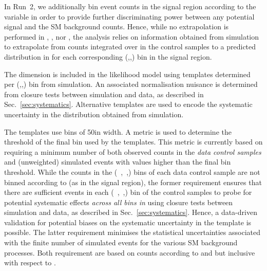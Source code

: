 In Run~2, we additionally bin event counts in the signal region according to the variable \mht in order to provide further
discriminating power between any potential signal and the SM background counts. Hence, while no extrapolation is performed in
\njet, \nb, nor \HT, the analysis relies on information obtained from simulation to extrapolate from counts integrated over \mht in
the control samples to a predicted distribution in \mht for each corresponding (\njet,\nb,\HT) bin in the signal region.

The \mht dimension is included in the likelihood model using templates determined per (\njet,\nb,\HT) bin from simulation. An associated
normalisation nuisance is determined from closure tests between simulation and data, as described in
Sec.~\ref{sec:systematics}. Alternative templates are used to encode the systematic uncertainty in the \mht distribution obtained from
simulation. 

The templates use \mht bins of 50\gev in width. A metric is used to determine the threshold of the final \mht bin used by the
templates. This metric is currently based on requiring a minimum number of both observed counts in the {\it data control samples} and
(unweighted) simulated events with \mht values higher than the final bin threshold. While the counts in the (\njet~,\nb~,\HT) bins of each
data control sample are not binned according to \mht (as in the signal region), the former requirement ensures that there are
sufficient events in each (\njet~,\nb~,\HT) bin of the control samples to probe for potential systematic effects {\it across all bins in
  \mht} using closure tests between simulation and data, as described in Sec.~\ref{sec:systematics}. Hence, a data-driven validation for
potential biases on the systematic uncertainty in the \mht template is possible. The latter requirement minimises the statistical
uncertainties associated with the finite number of simulated events for the various SM background processes. Both requirement are based on
counts according to \njet and \nb but inclusive with respect to \nb.
